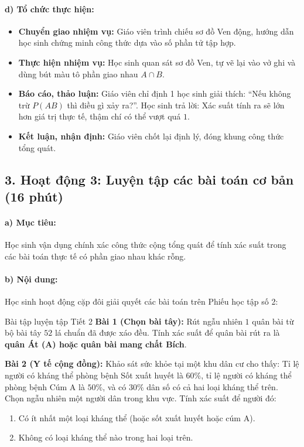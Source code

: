 \documentclass[12pt, a4paper]{article}
\begin{document}
\paragraph{d) Tổ chức thực hiện:}
\begin{itemize}[leftmargin=0.8cm]
    \item \textbf{Chuyển giao nhiệm vụ:} Giáo viên trình chiếu sơ đồ Ven động, hướng dẫn học sinh chứng minh công thức dựa vào số phần tử tập hợp.
    \item \textbf{Thực hiện nhiệm vụ:} Học sinh quan sát sơ đồ Ven, tự vẽ lại vào vở ghi và dùng bút màu tô phần giao nhau $A \cap B$.
    \item \textbf{Báo cáo, thảo luận:} Giáo viên chỉ định 1 học sinh giải thích: ``Nếu không trừ $P(AB)$ thì điều gì xảy ra?''. Học sinh trả lời: Xác suất tính ra sẽ lớn hơn giá trị thực tế, thậm chí có thể vượt quá $1$.
    \item \textbf{Kết luận, nhận định:} Giáo viên chốt lại định lý, đóng khung công thức tổng quát.
\end{itemize}

\subsection*{3. Hoạt động 3: Luyện tập các bài toán cơ bản (16 phút)}

\paragraph{a) Mục tiêu:} Học sinh vận dụng chính xác công thức cộng tổng quát để tính xác suất trong các bài toán thực tế có phần giao nhau khác rỗng.

\paragraph{b) Nội dung:} Học sinh hoạt động cặp đôi giải quyết các bài toán trên Phiếu học tập số 2:

\begin{pedabox}{Bài tập luyện tập Tiết 2}
\textbf{Bài 1 (Chọn bài tây):} Rút ngẫu nhiên $1$ quân bài từ bộ bài tây $52$ lá chuẩn đã được xáo đều. Tính xác suất để quân bài rút ra là \textbf{quân Át (A) hoặc quân bài mang chất Bích}.

\textbf{Bài 2 (Y tế cộng đồng):} Khảo sát sức khỏe tại một khu dân cư cho thấy: Tỉ lệ người có kháng thể phòng bệnh Sốt xuất huyết là $60\%$, tỉ lệ người có kháng thể phòng bệnh Cúm A là $50\%$, và có $30\%$ dân số có cả hai loại kháng thể trên. Chọn ngẫu nhiên một người dân trong khu vực. Tính xác suất để người đó:
\begin{enumerate}[leftmargin=0.6cm]
    \item[a)] Có ít nhất một loại kháng thể (hoặc sốt xuất huyết hoặc cúm A).
    \item[b)] Không có loại kháng thể nào trong hai loại trên.
\end{enumerate}
\end{pedabox}
\end{document}
